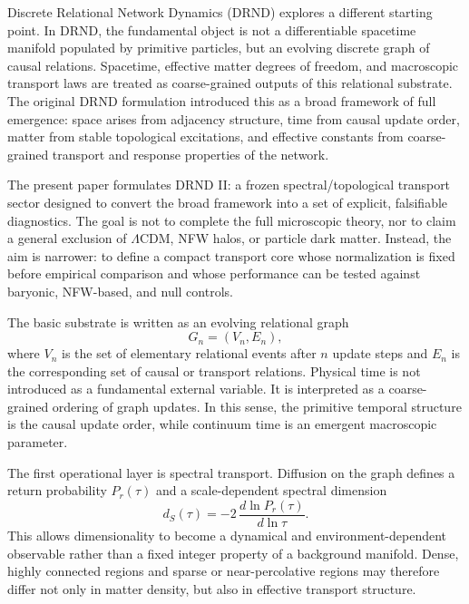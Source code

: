 \documentclass[12pt]{iopart}
\begin{document}
Discrete Relational Network Dynamics (DRND) explores a different starting point. In DRND, the fundamental object is not a differentiable spacetime manifold populated by primitive particles, but an evolving discrete graph of causal relations. Spacetime, effective matter degrees of freedom, and macroscopic transport laws are treated as coarse-grained outputs of this relational substrate. The original DRND formulation introduced this as a broad framework of full emergence: space arises from adjacency structure, time from causal update order, matter from stable topological excitations, and effective constants from coarse-grained transport and response properties of the network.

The present paper formulates DRND II: a frozen spectral/topological transport sector designed to convert the broad framework into a set of explicit, falsifiable diagnostics. The goal is not to complete the full microscopic theory, nor to claim a general exclusion of $\Lambda$CDM, NFW halos, or particle dark matter. Instead, the aim is narrower: to define a compact transport core whose normalization is fixed before empirical comparison and whose performance can be tested against baryonic, NFW-based, and null controls.

The basic substrate is written as an evolving relational graph
\begin{equation}
G_n=(V_n,E_n),
\end{equation}
where $V_n$ is the set of elementary relational events after $n$ update steps and $E_n$ is the corresponding set of causal or transport relations. Physical time is not introduced as a fundamental external variable. It is interpreted as a coarse-grained ordering of graph updates. In this sense, the primitive temporal structure is the causal update order, while continuum time is an emergent macroscopic parameter.

The first operational layer is spectral transport. Diffusion on the graph defines a return probability $P_r(\tau)$ and a scale-dependent spectral dimension
\begin{equation}
d_S(\tau)=-2\,\frac{d\ln P_r(\tau)}{d\ln \tau}.
\end{equation}
This allows dimensionality to become a dynamical and environment-dependent observable rather than a fixed integer property of a background manifold. Dense, highly connected regions and sparse or near-percolative regions may therefore differ not only in matter density, but also in effective transport structure.
\end{document}
